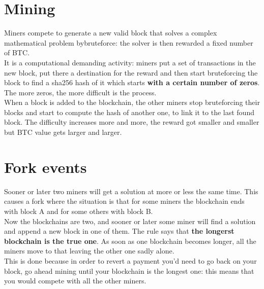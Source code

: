     \section{Mining}
        Miners compete to generate a new valid block that solves a complex mathematical problem bybruteforce: the solver is then rewarded a fixed number of BTC.\\
        It is a computational demanding activity: miners put a set of transactions in the new block, put there a destination for the reward and then start bruteforcing the block to find a sha256 hash of it which starts \textbf{with a certain number of zeros}. The more zeros, the more difficult is the process.\\
        When a block is added to the blockchain, the other miners stop bruteforcing their blocks and start to compute the hash of another one, to link it to the last found block.
        The difficulty increases more and more, the reward got smaller and smaller but BTC value gets larger and larger.
    \section{Fork events}
        Sooner or later two miners will get a solution at more or less the same time. This causes a fork where the situation is that for some miners the blockchain ends with block A and for some others with block B.\\
        Now the blockchains are two, and sooner or later some miner will find a solution and append a new block in one of them. The rule says that \textbf{the longerst blockchain is the true one}. As soon as one blockchain becomes longer, all the miners move to that leaving the other one sadly alone.\\
        This is done because in order to revert a payment you'd need to go back on your block, go ahead mining until your blockchain is the longest one: this means that you would compete with all the other miners.     